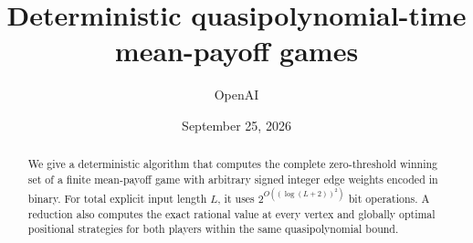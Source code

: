 \documentclass[11pt]{article}
\title{Deterministic quasipolynomial-time mean-payoff games}
\author{OpenAI}
\date{September 25, 2026}
\begin{document}
\maketitle
\begin{abstract}
We give a deterministic algorithm that computes the complete zero-threshold
winning set of a finite mean-payoff game with arbitrary signed integer edge
weights encoded in binary. For total explicit input length $L$, it uses
$2^{O((\log(L+2))^2)}$ bit operations. A reduction also computes the exact
rational value at every vertex and globally optimal positional strategies
for both players within the same quasipolynomial bound.
\end{abstract}
\setcounter{tocdepth}{1}
\hypersetup{bookmarksdepth=2}
\tableofcontents
\clearpage











\end{document}

